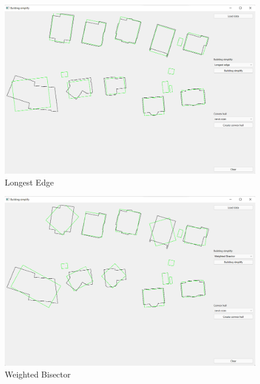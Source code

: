 \documentclass[11pt]{article}
\begin{document}
	\begin{figure}[htbh]
		\centering
		\includegraphics[scale=0.39]{images/U2_aplikace_LongestEdge2.png} 
		\caption{Longest Edge}
		\label{fig:app_LongestEdge}
	\end{figure} \begin{figure}[htbh]
		\centering
		\includegraphics[scale=0.39]{images/U2_aplikace_WeightedBisector2.png} 
		\caption{Weighted Bisector}
		\label{fig:app_WeightedBisector}
	\end{figure} 
	
	\clearpage
	
\end{document}
